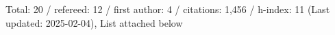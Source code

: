 Total: 20 / refereed: 12 / first author: 4 / citations: 1,456 / h-index: 11 (Last updated: 2025-02-04), List attached below
